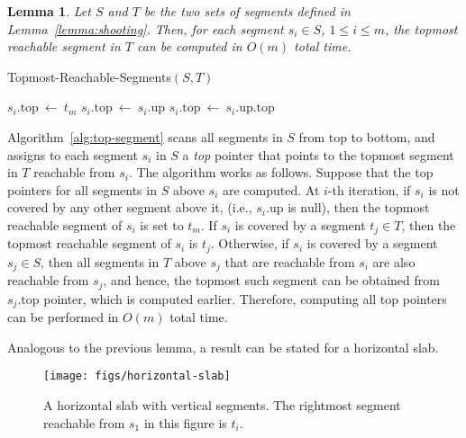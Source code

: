 \documentclass[12pt]{dalthesis}
\def\favoritefont{\bfseries \sffamily}
\def\QED{\ensuremath{{\Box}}}
\def\markatright#1{\leavevmode\unskip\nobreak\quad\hspace*{\fill}{#1}}
\newenvironment{proof}
	{\begin{trivlist}\item[\hskip\labelsep{\favoritefont Proof:}]}
	{\markatright{\QED}\end{trivlist}}
\newtheorem{lemma}[theorem]{Lemma}
\newcommand{\qed}{}
\newcommand{\lee}{\leqslant}
\newcommand{\eq}{{\ \leftarrow\ }}
\newcommand{\topp}{\text{top}}
\newcommand{\up}{\text{up}}
\newcommand{\nil}{\mbox{null}}
\begin{document}
\begin{lemma} \label{lemma:top-segment}
	Let $S$ and $T$ be the two sets of segments  defined in Lemma~\ref{lemma:shooting}.
	Then, for each segment $s_i \in S$, $1 \lee i \lee m$, 
	the topmost reachable segment in $T$
	can be computed in $O(m)$ total time.
\end{lemma}


\begin{algorithm} [h]
\caption {\sc Topmost-Reachable-Segments$(S,T)$} \label{alg:top-segment}
\begin{algorithmic}[1]
	\vspace{0.5em}
	\baselineskip
		\IF {$s_i.\up = \nil$}
			\STATE $s_i.\topp \eq t_m$
		\ELSIF {$s_i.\up \in T$}
			\STATE $s_i.\topp \eq s_i.\up$
		\ELSE
			\STATE $s_i.\topp \eq s_i.\up.\topp$
		\ENDIF
	\ENDFOR 
\end{algorithmic}
\end{algorithm}

\begin{proof}
	Algorithm~\ref{alg:top-segment} scans all segments in $S$ from top to bottom,
	and assigns to each segment $s_i$ in $S$
	a \emph{top} pointer that points to the topmost segment in $T$ reachable from $s_i$.
	The algorithm works as follows.
	Suppose that the top pointers for all segments in $S$ above $s_i$ are computed.
	At $i$-th iteration, if $s_i$ is not covered by any other segment above it,
	(i.e., $s_i.\up$ is $\nil$), then the topmost reachable segment of $s_i$ is set to $t_m$.
	If $s_i$ is covered by a segment $t_j \in T$, 
	then the topmost reachable segment of $s_i$ is $t_j$.
	Otherwise, if $s_i$ is covered by a segment $s_j \in S$,
	then all segments in $T$ above $s_j$ that are reachable from $s_i$ are also reachable from $s_j$,
	and hence, the topmost such segment can be obtained from $s_j.\topp$ pointer,
	which is computed earlier.
	Therefore, computing all top pointers can be performed in $O(m)$ total time.
	\qed
\end{proof}

\noindent
Analogous to the previous lemma, 
a result can be stated for a horizontal slab.


\begin{figure}[t]
	\centering
	\texttt{[image: figs/horizontal-slab]}
	\caption{A horizontal slab with vertical segments. 
	The rightmost segment reachable from $s_1$ in this figure is $t_i$.
	}
	\label{fig:horizontal}
\end{figure}
\end{document}
